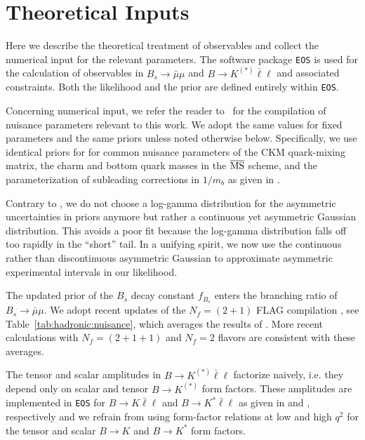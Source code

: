 \documentclass[twocolumn,epjc3]{svjour3}
\numberwithin{equation}{section}
\def \reftab#1{Table~\ref{#1}}
\newcommand{\checked}[1]{{\color{brown}{ {\bf Checked: }{#1}}}}
\renewcommand{\checked}[1]{#1}
\renewcommand{\[}{\big[}
\renewcommand{\]}{\big]}
\renewcommand{\(}{\big(}
\renewcommand{\)}{\big)}
\def \eos{\texttt{EOS}}
\begin{document}
%
%
%
\section{
  \checked{Theoretical Inputs}
  \label{app:theory:inputs}
}

Here we describe the theoretical treatment of observables and collect the
numerical input for the relevant parameters. The software package \eos{}
\cite{Bobeth:2011gi, Bobeth:2011nj, EOS} is used for the calculation of
observables in $B_s\to \bar\mu\mu$ and $B\to K^{(*)}\bar\ell\ell$ and associated
constraints. Both the likelihood and the prior are defined entirely within \eos.

Concerning numerical input, we refer the reader to~\cite{Beaujean:2013soa} for
the compilation of nuisance parameters relevant to this work. We adopt the same
values for fixed parameters and the same priors unless noted otherwise
below. Specifically, we use identical priors for for common nuisance parameters
of the CKM quark-mixing matrix, the charm and bottom quark masses in the
$\overline{\rm MS}$ scheme, and the parameterization of subleading corrections
in $1/m_b$ as given in \cite{Beaujean:2013soa}.

Contrary to \cite{Beaujean:2013soa}, we do not choose a log-gamma
distribution for the asymmetric uncertainties in priors anymore but
rather a continuous yet asymmetric Gaussian distribution. This avoids
a poor fit because the log-gamma distribution falls off too rapidly in
the ``short'' tail. In a unifying spirit, we now use the continuous rather
than discontinuous asymmetric Gaussian to approximate asymmetric
experimental intervals in our likelihood.

The updated prior of the $B_s$ decay constant $f_{B_s}$ enters the branching
ratio of $B_s\to \bar\mu\mu$. We adopt recent updates of the $N_f = (2 + 1)$
FLAG compilation \cite{Aoki:2013ldr}, see \reftab{tab:hadronic:nuisance}, which
averages the results of \cite{Bazavov:2011aa, McNeile:2011ng, Na:2012kp}.  More
recent calculations with $N_f = (2+1+1)$ \cite{Dowdall:2013tga} and $N_f = 2$
\cite{Carrasco:2013zta} flavors are consistent with these averages.

The tensor and scalar amplitudes in $B\to K^{(*)} \bar\ell\ell$ factorize
naively, i.e. they depend only on scalar and tensor $B\to K^{(*)}$ form
factors. These amplitudes are implemented in \eos{} for $B\to K \bar\ell\ell$
and $B\to K^* \bar\ell\ell$ as given in \cite{Bobeth:2007dw} and
\cite{Bobeth:2012vn}, respectively and we refrain from using form-factor
relations at {low and high $q^2$} for the tensor and scalar $B\to K$ and $B\to
K^*$ form factors.
\end{document}
